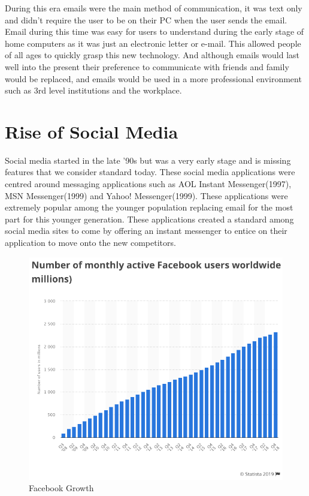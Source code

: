 During this era emails were the main method of communication, it was text only and didn't require the user to be on their PC when the user sends the email. Email during this time was easy for users to understand during the early stage of home computers as it was just an electronic letter or e-mail. This allowed people of all ages to quickly grasp this new technology. And although emails would last well into the present their preference to communicate with friends and family would be replaced, and emails would be used in a more professional environment such as 3rd level institutions and the workplace.

\section{Rise of Social Media}
Social media started in the late '90s but was a very early stage and is missing features that we consider standard today. These social media applications were centred around messaging applications such as AOL Instant Messenger(1997), MSN Messenger(1999) and Yahoo! Messenger(1999). These applications were extremely popular among the younger population replacing email for the most part for this younger generation. These applications created a standard among social media sites to come by offering an instant messenger to entice on their application to move onto the new competitors.

\begin{figure}[!htb]
  \includegraphics[width=\linewidth]{img/facebook-growth.png}
  \caption{Facebook Growth}
  \label{fig:FacebookG}
\end{figure}

